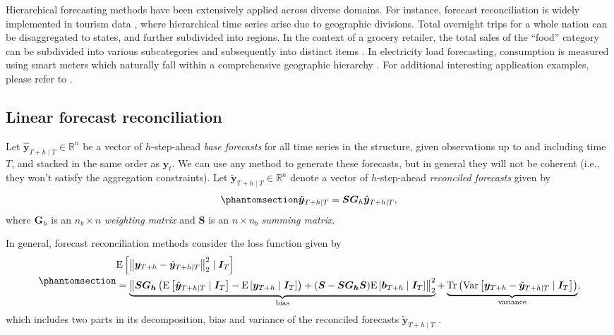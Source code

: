 \documentclass[
  11pt]{article}
\theoremstyle{plain}
\theoremstyle{remark}
\begin{document}
Hierarchical forecasting methods have been extensively applied across
diverse domains. For instance, forecast reconciliation is widely
implemented in tourism data \citep{Athanasopoulos2009-ps}, where
hierarchical time series arise due to geographic divisions. Total
overnight trips for a whole nation can be disaggregated to states, and
further subdivided into regions. In the context of a grocery retailer,
the total sales of the ``food'' category can be subdivided into various
subcategories and subsequently into distinct items
\citep{Zhang2023-op, Hollyman2021-un}. In electricity load forecasting,
consumption is measured using smart meters which naturally fall within a
comprehensive geographic hierarchy \citep{Taieb2021-tc}. For additional
interesting application examples, please refer to
\citet{Athanasopoulos2023-sm}.

\subsection{Linear forecast
reconciliation}\label{linear-forecast-reconciliation}

Let \(\hat{\bm{y}}_{T+h \mid T} \in \mathbb{R}^n\) be a vector of
\(h\)-step-ahead \emph{base forecasts} for all time series in the
structure, given observations up to and including time \(T\), and
stacked in the same order as \(\bm{y}_t\). We can use any method to
generate these forecasts, but in general they will not be coherent
(i.e., they won't satisfy the aggregation constraints). Let
\(\tilde{\bm{y}}_{T+h \mid T} \in \mathbb{R}^n\) denote a vector of
\(h\)-step-ahead \emph{reconciled forecasts} given by
\begin{equation}\phantomsection\label{eq-lr}{
\tilde{\bm{y}}_{T+h \mid T} = \bm{S}\bm{G}_h\hat{\bm{y}}_{T+h \mid T},
}\end{equation} where \(\bm{G}_h\) is an \(n_b \times n\)
\emph{weighting matrix} and \(\bm{S}\) is an \(n \times n_b\)
\emph{summing matrix}.

In general, forecast reconciliation methods consider the loss function
given by \begin{equation}\phantomsection\label{eq-loss}{
\begin{aligned}
& \mathrm{E}\left[\left\|\bm{y}_{T+h}-\tilde{\bm{y}}_{T+h \mid T}\right\|_2^2 \mid \bm{I}_T\right] \\
& =\underbrace{\left\|\bm{S G_h}\left(\mathrm{E}\left[\hat{\bm{y}}_{T+h \mid T} \mid \bm{I}_T\right]-\mathrm{E}\left[\bm{y}_{T+h} \mid \bm{I}_T\right]\right)+(\bm{S}-\bm{S G_h S}) \mathrm{E}\left[\bm{b}_{T+h} \mid \bm{I}_T\right]\right\|_2^2}_{\text{bias}} +\underbrace{\operatorname{Tr}\left(\operatorname{Var}\left[\bm{y}_{T+h}-\tilde{\bm{y}}_{T+h \mid T} \mid \bm{I}_T\right]\right)}_{\text{variance}},
\end{aligned}
}\end{equation} which includes two parts in its decomposition, bias and
variance of the reconciled forecasts \(\tilde{\bm{y}}_{T+h \mid T}\)
\citep{Ben_Taieb2019-be}.
\end{document}
